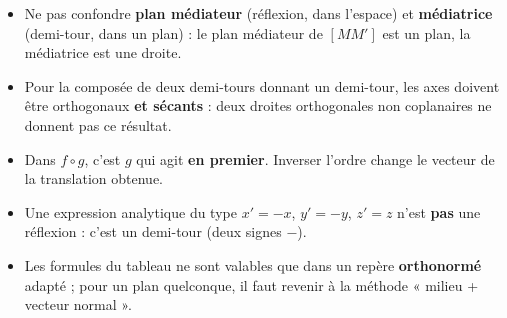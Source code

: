 \documentclass[11pt]{article}
\begin{document}
\begin{attention}
\begin{itemize}
  \item Ne pas confondre \textbf{plan médiateur} (réflexion, dans l'espace) et \textbf{médiatrice} (demi-tour, dans un plan) : le plan médiateur de $[MM']$ est un plan, la médiatrice est une droite.
  \item Pour la composée de deux demi-tours donnant un demi-tour, les axes doivent être orthogonaux \textbf{et sécants} : deux droites orthogonales non coplanaires ne donnent pas ce résultat.
  \item Dans $f\circ g$, c'est $g$ qui agit \textbf{en premier}. Inverser l'ordre change le vecteur de la translation obtenue.
  \item Une expression analytique du type $x'=-x$, $y'=-y$, $z'=z$ n'est \textbf{pas} une réflexion : c'est un demi-tour (deux signes $-$).
  \item Les formules du tableau ne sont valables que dans un repère \textbf{orthonormé} adapté ; pour un plan quelconque, il faut revenir à la méthode « milieu + vecteur normal ».
\end{itemize}
\end{attention}
\end{document}
